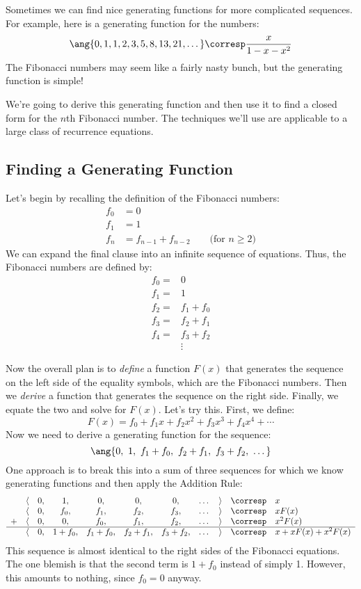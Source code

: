 Sometimes we can find nice generating functions for more complicated
sequences.  For example, here is a generating function for the
 numbers:
%
\[
\ang{0, 1, 1, 2, 3, 5, 8, 13, 21, \dots} \corresp \frac{x}{1-x-x^2}
\]
%
The Fibonacci numbers may seem like a fairly nasty bunch, but the
generating function is simple!

We're going to derive this generating function and then use it to find a
closed form for the $n$th Fibonacci number.  The techniques we'll use are
applicable to a large class of recurrence equations.

\subsection{Finding a Generating Function}

Let's begin by recalling the definition of the Fibonacci numbers:
%
\begin{align*}
f_0 & = 0 \\
f_1 & = 1 \\
f_n & = f_{n-1} + f_{n-2} \qquad \text{(for $n \geq 2$)}
\end{align*}
%
We can expand the final clause into an infinite sequence of equations.
Thus, the Fibonacci numbers are defined by:
%
\begin{align*}
f_0 = & 0 \\
f_1 = & 1 \\
f_2 = & f_1 + f_0 \\
f_3 = & f_2 + f_1 \\
f_4 = & f_3 + f_2 \\
      & \vdots
\end{align*}

Now the overall plan is to \textit{define} a function $F(x)$ that
generates the sequence on the left side of the equality symbols, which
are the Fibonacci numbers.  Then we \textit{derive} a function that
generates the sequence on the right side.  Finally, we equate the two
and solve for $F(x)$.  Let's try this.  First, we define:
%
\[
F(x) = f_0 + f_1 x + f_2 x^2 + f_3 x^3 + f_4 x^4 + \cdots
\]
%
Now we need to derive a generating function for the sequence:
%
\[
\ang{0,\ 1,\ f_1 + f_0,\ f_2 + f_1,\ f_3 + f_2,\ \dots}
\]
%
One approach is to break this into a sum of three sequences for which
we know generating functions and then apply the Addition Rule:
%
\[
\begin{array}{ccccccccccl}
  & \langle & 0, & 1, & 0, & 0, & 0, & \dots & \rangle
    & \corresp & x \\
  & \langle & 0, & f_0, & f_1, & f_2, & f_3, & \dots & \rangle
    & \corresp & x F(x) \\
+ & \langle & 0, & 0, & f_0, & f_1, & f_2, & \dots & \rangle
    & \corresp & x^2 F(x) \\ \hline
  & \langle & 0, & 1 + f_0, & f_1 + f_0, & f_2 + f_1, & f_3 + f_2, & \dots & \rangle
    & \corresp & x + x F(x) + x^2 F(x) \\
\end{array}
\]
%
This sequence is almost identical to the right sides of the Fibonacci
equations.  The one blemish is that the second term is $1 + f_0$
instead of simply 1.  However, this amounts to nothing, since $f_0 =
0$ anyway.

